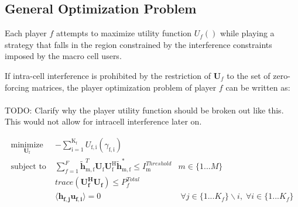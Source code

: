\documentclass[12pt]{article}
\begin{document}
%
%


\subsection{General Optimization Problem}

Each player $f$ attempts to maximize utility function $U_f()$ while playing a strategy that falls in the region constrained by the interference constraints imposed by the macro cell users.
\par

If intra-cell interference is  prohibited by the restriction of $\mathbf{U}_f$ to the set of zero-forcing matrices, the player optimization problem of player $f$ can be written as:
\\\\
TODO: Clarify why the player utility function should be broken out like this. This would not allow for intracell interference later on. 

	
	\begin{subequations}
	\label{optim}
	\begin{align}
	    \underset{\mathbf{U}_{\mathrm{f}} }{\text{minimize}} \;
	    & - \sum_{\mathrm{i=1}}^{\mathrm{K_f}}
    	U_{\mathrm{f,i}}(\gamma_{\mathrm{f,i}}) \label{player_opt} \\
	    \text{subject to} \; &
	   \sum^F_{f=1} \mathbf{\tilde{h}}_{\mathrm{m,f}}^T  \mathbf{U_{\mathrm{f}}}		
	\mathbf{U_{\mathrm{f}}^{\mathrm{H}}} \mathbf{\tilde{h}_{\mathrm{m,f}}^*} \leq I^{Threshold}		
	_{\mathrm{m}} & m \in \{1 ...M\} 
		\label{interference_const}\\
        & trace(\mathbf{U_f^H}\mathbf{U_f}) \leq P^{Total}_{f} \label{power_const}\\
        & \langle \mathbf{h_{f,j}}\mathbf{u_{f,i}} \rangle =0\ & \; \forall j \in \{1... K_f\}\backslash i ,\; \forall i \in \{1 ... K_f\} \label{zf_const}
	\end{align}
	\end{subequations}
\end{document}
